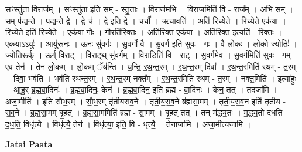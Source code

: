 \documentclass[17pt]{extarticle}
\begin{document}
सꣳस्तु॑ता वि॒राज᳚म् । सꣳस्तु॑ता॒ इति॒ सम् - स्तु॒ताः॒ । वि॒राज॑म॒भि । वि॒राज॒मिति॑ वि - राज᳚म् । अ॒भि सम् । सम् प॑द्यन्ते । प॒द्य॒न्ते॒ द्वे । द्वे च॑ । द्वे इति॒ द्वे । चर्चौ᳚ । ऋचा॒वति॑ । अति॑ रिच्येते । रि॒च्ये॒ते॒ एक॑या । रि॒च्ये॒ते॒ इति॑ रिच्येते । एक॑या॒ गौः । गौरति॑रिक्तः । अति॑रिक्त॒ एक॑या । अति॑रिक्त॒ इत्यति॑ - रि॒क्तः॒ । एक॒याऽऽयुः॑ । आयु॑रू॒नः । ऊ॒नः सु॑व॒र्गः । सु॒व॒र्गो वै । सु॒व॒र्ग इति॑ सुवः - गः । वै लो॒कः । लो॒को ज्योतिः॑ । ज्योति॒रूर्क् । ऊर्ग् वि॒राट् । वि॒राट्थ् सु॑व॒र्गम् । वि॒राडिति॑ वि - राट् । सु॒व॒र्गमे॒व । सु॒व॒र्गमिति॑ सुवः - गम् । ए॒व तेन॑ । तेन॑ लो॒कम् । लो॒कम् ॅय॑न्ति । य॒न्ति॒ र॒थ॒न्त॒रम् । र॒थ॒न्त॒रम् दिवा᳚ । र॒थ॒न्त॒रमिति॑ रथम् - त॒रम् । दिवा॒ भव॑ति । भव॑ति रथन्त॒रम् । र॒थ॒न्त॒रम् नक्त᳚म् । र॒थ॒न्त॒रमिति॑ रथम् - त॒रम् । नक्त॒मिति॑ । इत्या॑हुः । आ॒हु॒र् ब्र॒ह्म॒वा॒दिनः॑ । ब्र॒ह्म॒वा॒दिनः॒ केन॑ । ब्र॒ह्म॒वा॒दिन॒ इति॑ ब्रह्म - वा॒दिनः॑ । केन॒ तत् । तदजा॑मि । अजा॒मीति॑ । इति॑ सौभ॒रम् । सौ॒भ॒रम् तृ॑तीयसव॒ने । तृ॒ती॒य॒स॒व॒ने ब्र॑ह्मसा॒मम् । तृ॒ती॒य॒स॒व॒न इति॑ तृतीय - स॒व॒ने । ब्र॒ह्म॒सा॒मम् बृ॒हत् । ब्र॒ह्म॒सा॒ममिति॑ ब्रह्म - सा॒मम् । बृ॒हत् तत् । तन् म॑द्ध्य॒तः । म॒द्ध्य॒तो द॑धति । द॒ध॒ति॒ विधृ॑त्यै । विधृ॑त्यै॒ तेन॑ । विधृ॑त्या॒ इति॒ वि - धृ॒त्यै॒ । तेनाजा॑मि । अजा॒मीत्यजा॑मि । \newline

\textbf{Jatai Paata} \newline
\end{document}
